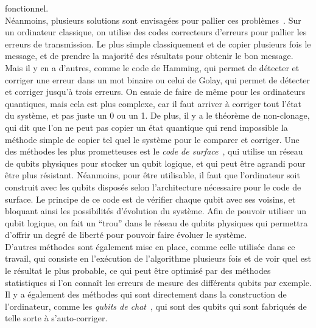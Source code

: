 fonctionnel.\\
Néanmoins, plusieurs solutions sont envisagées pour pallier ces problèmes~\cite{error-code}.
Sur un ordinateur classique, on utilise des codes correcteurs d'erreurs pour pallier les erreurs
de transmission.
Le plus simple classiquement et de copier plusieurs fois le message, et de prendre la majorité
des résultats pour obtenir le bon message.
Mais il y en a d'autres, comme le code de Hamming, qui permet de détecter et corriger une erreur
dans un mot binaire ou celui de Golay, qui permet de détecter et corriger jusqu'à trois erreurs.
On essaie de faire de même pour les ordinateurs quantiques, mais cela est plus complexe, car
il faut arriver à corriger tout l'état du système, et pas juste un 0 ou un 1.
De plus, il y a le théorème de non-clonage, qui dit que l'on ne peut pas copier un état quantique
qui rend impossible la méthode simple de copier tel quel le système pour le comparer et corriger.
Une des méthodes les plus prometteuses est le \textit{code de surface}~\cite{surface-code}, qui utilise un réseau de
qubits physiques pour stocker un qubit logique, et qui peut être agrandi pour être plus résistant.
Néanmoins, pour être utilisable, il faut que l'ordinateur soit construit avec les qubits disposés
selon l'architecture nécessaire pour le code de surface.
Le principe de ce code est de vérifier chaque qubit avec ses voisins, et bloquant ainsi les
possibilités d'évolution du système.
Afin de pouvoir utiliser un qubit logique, on fait un ``trou'' dans le réseau de qubits physiques
qui permettra d'offrir un degré de liberté pour pouvoir faire évoluer le système.\\
D'autres méthodes sont également mise en place, comme celle utilisée dans ce travail, qui consiste
en l'exécution de l'algorithme plusieurs fois et de voir quel est le résultat le plus probable,
ce qui peut être optimisé par des méthodes statistiques si l'on connaît les erreurs de mesure
des différents qubits par exemple.
Il y a également des méthodes qui sont directement dans la construction de l'ordinateur, comme
les \textit{qubits de chat}~\cite{Lescanne2020}, qui sont des qubits qui sont fabriqués de telle sorte
à s'auto-corriger.


